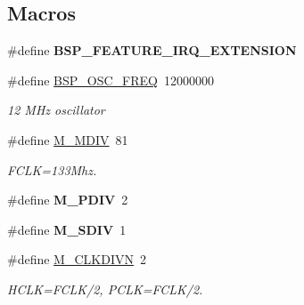 \subsection*{Macros}
\begin{DoxyCompactItemize}
\item 
\mbox{\label{group__RTEMSBSPsARMSMDK2410_ga5d7d631d3a14b7554160f14eb42f351b}} 
\#define {\bfseries B\+S\+P\+\_\+\+F\+E\+A\+T\+U\+R\+E\+\_\+\+I\+R\+Q\+\_\+\+E\+X\+T\+E\+N\+S\+I\+ON}
\item 
\mbox{\label{group__RTEMSBSPsARMSMDK2410_gad07ed248b4d9108c92d0f80786ec17ab}} 
\#define \mbox{\hyperlink{group__RTEMSBSPsARMSMDK2410_gad07ed248b4d9108c92d0f80786ec17ab}{B\+S\+P\+\_\+\+O\+S\+C\+\_\+\+F\+R\+EQ}}~12000000
\begin{DoxyCompactList}\small\item\em 12 M\+Hz oscillator \end{DoxyCompactList}\item 
\mbox{\label{group__RTEMSBSPsARMSMDK2410_ga01d6c4bba0f01d835b5953aa038c49bd}} 
\#define \mbox{\hyperlink{group__RTEMSBSPsARMSMDK2410_ga01d6c4bba0f01d835b5953aa038c49bd}{M\+\_\+\+M\+D\+IV}}~81
\begin{DoxyCompactList}\small\item\em F\+C\+LK=133Mhz. \end{DoxyCompactList}\item 
\mbox{\label{group__RTEMSBSPsARMSMDK2410_ga7861046db91fdca03f30814033ca8422}} 
\#define {\bfseries M\+\_\+\+P\+D\+IV}~2
\item 
\mbox{\label{group__RTEMSBSPsARMSMDK2410_ga54f6a9d4f796b7f1a3d5fe0f7baa4d71}} 
\#define {\bfseries M\+\_\+\+S\+D\+IV}~1
\item 
\mbox{\label{group__RTEMSBSPsARMSMDK2410_gaf6167392e26125f8167faf377c4ffe96}} 
\#define \mbox{\hyperlink{group__RTEMSBSPsARMSMDK2410_gaf6167392e26125f8167faf377c4ffe96}{M\+\_\+\+C\+L\+K\+D\+I\+VN}}~2
\begin{DoxyCompactList}\small\item\em H\+C\+LK=F\+C\+L\+K/2, P\+C\+LK=F\+C\+L\+K/2. \end{DoxyCompactList}\item 

\end{DoxyCompactItemize}
